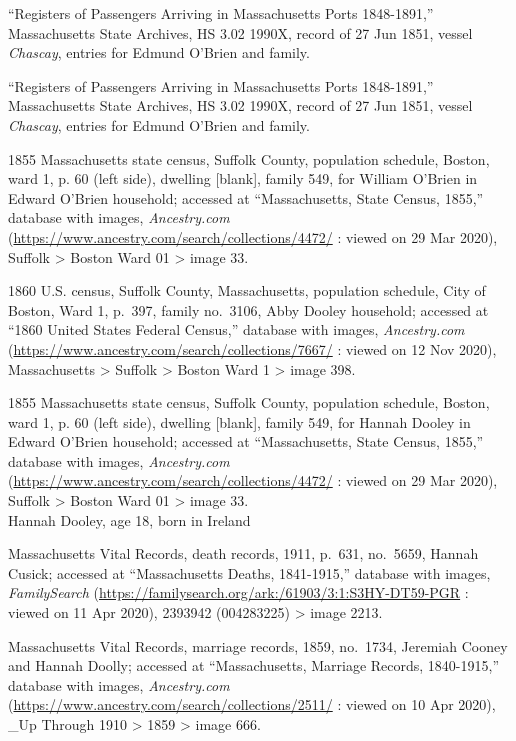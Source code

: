 \begin{thebibliography}{999}
``Registers of Passengers Arriving in Massachusetts Ports 1848-1891,'' Massachusetts State Archives, HS 3.02 1990X, record of 27 Jun 1851, vessel \textit{Chascay}, entries for Edmund O'Brien and family.

``Registers of Passengers Arriving in Massachusetts Ports 1848-1891,'' Massachusetts State Archives, HS 3.02 1990X, record of 27 Jun 1851, vessel \textit{Chascay}, entries for Edmund O'Brien and family.

1855 Massachusetts state census, Suffolk County, population schedule, Boston, ward 1, p. 60 (left side), dwelling [blank], family 549, for William O'Brien in Edward O'Brien household; accessed at ``Massachusetts, State Census, 1855,'' database with images, \textit{Ancestry.com} (\url{https://www.ancestry.com/search/collections/4472/} : viewed on 29 Mar 2020), Suffolk > Boston Ward 01 > image 33.

1860 U.S. census, Suffolk County, Massachusetts, population schedule, City of Boston, Ward 1, p.\ 397, family no.\ 3106, Abby Dooley household; accessed at ``1860 United States Federal Census,'' database with images, \textit{Ancestry.com} (\url{https://www.ancestry.com/search/collections/7667/} : viewed on 12 Nov 2020), Massachusetts > Suffolk > Boston Ward 1 > image 398.

1855 Massachusetts state census, Suffolk County, population schedule, Boston, ward 1, p. 60 (left side), dwelling [blank], family 549, for Hannah Dooley in Edward O'Brien household; accessed at ``Massachusetts, State Census, 1855,'' database with images, \textit{Ancestry.com} (\url{https://www.ancestry.com/search/collections/4472/} : viewed on 29 Mar 2020), Suffolk > Boston Ward 01 > image 33.\\
Hannah Dooley, age 18, born in Ireland

Massachusetts Vital Records, death records, 1911, p.\ 631, no.\ 5659, Hannah Cusick; accessed at ``Massachusetts Deaths, 1841-1915,'' database with images, \textit{FamilySearch} (\url{https://familysearch.org/ark:/61903/3:1:S3HY-DT59-PGR} : viewed on 11 Apr 2020), 2393942 (004283225) > image 2213.

Massachusetts Vital Records, marriage records, 1859, no.\ 1734, Jeremiah Cooney and Hannah Doolly; accessed at ``Massachusetts, Marriage Records, 1840-1915,'' database with images, \textit{Ancestry.com} (\url{https://www.ancestry.com/search/collections/2511/} : viewed on 10 Apr 2020), \_Up Through 1910 > 1859 > image 666.


\end{thebibliography}
